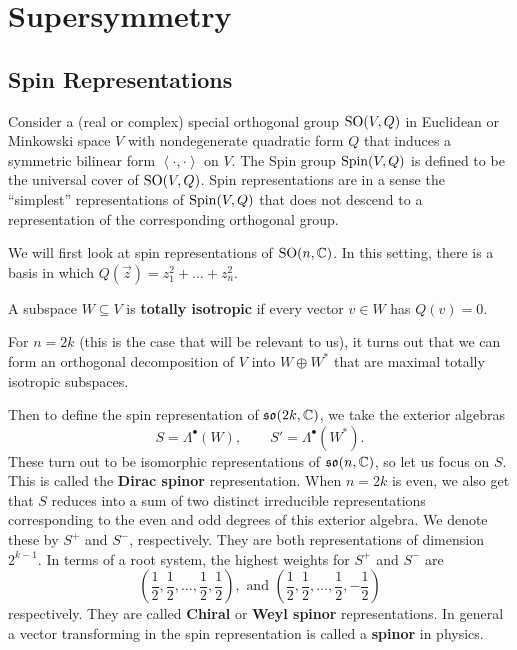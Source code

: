 
	\section{Supersymmetry} %
	\label{sec:supersymmetry}
	\subsection{Spin Representations} %
	\label{sub:spin_representations}

		Consider a (real or complex) special orthogonal group $\mathrm{SO}(V, Q)$ in Euclidean or Minkowski space $V$ with nondegenerate quadratic form $Q$ that induces a symmetric bilinear form $\left < \cdot, \cdot \right>$ on $V$. The Spin group $\mathrm{Spin}(V, Q)$ is defined to be the universal cover of $\mathrm{SO}(V, Q)$. Spin representations are in a sense the ``simplest'' representations of $\mathrm{Spin}(V, Q)$ that does not descend to a representation of the corresponding orthogonal group. 
		
		We will first look at spin representations of $\mathrm{SO}(n, \mathbb{C})$. In this setting, there is a basis in which $Q(\vec z) = z_1^2 + \dots + z_n^2$. 
		\begin{defn}
			A subspace $W \subseteq V$ is \textbf{totally isotropic} if every vector $v \in W$ has $Q(v) = 0$. 
		\end{defn}
		For $n=2k$ (this is the case that will be relevant to us), it turns out that we can form an orthogonal decomposition of $V$ into $W \oplus W^*$ that are maximal totally isotropic subspaces. 
		
		Then to define the spin representation of $\frak{so}(2k, \mathbb{C})$, we take the exterior algebras
		\[
			S = \Lambda^\bullet (W), \qquad S' = \Lambda^\bullet(W^*).
		\]
		These turn out to be isomorphic representations of $\frak{so}(n, \mathbb{C})$, so let us focus on $S$. This is called the \textbf{Dirac spinor} representation. When $n = 2k$ is even, we also get that $S$ reduces into a sum of two distinct irreducible representations corresponding to the even and odd degrees of this exterior algebra. We denote these by $S^+$ and $S^-$, respectively. They are both representations of dimension $2^{k-1}$. In terms of a root system, the highest weights for $S^+$ and $S^-$ are
		\[
			\left(\frac12, \frac12, \dots, \frac12, \frac12\right), \text{ and } \left(\frac12, \frac12, \dots, \frac12, -\frac12\right)
		\]
		respectively. They are called \textbf{Chiral} or \textbf{Weyl spinor} representations. In general a vector transforming in the spin representation is called a \textbf{spinor} in physics.
		
